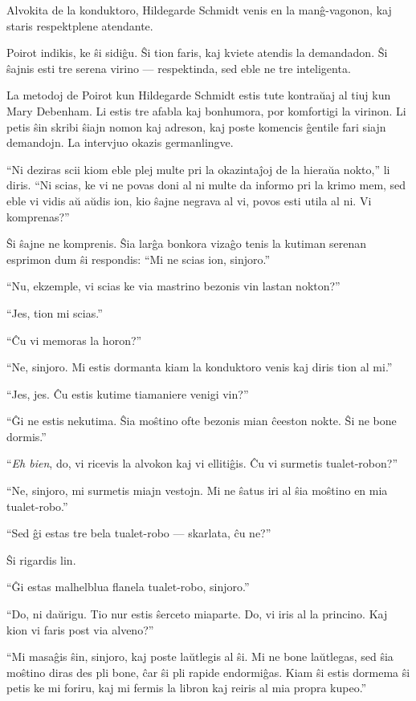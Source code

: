 Alvokita de la konduktoro, Hildegarde Schmidt venis en la manĝ-vagonon, kaj staris respektplene atendante.

Poirot indikis, ke ŝi sidiĝu. Ŝi tion faris, kaj kviete atendis la demandadon. Ŝi ŝajnis esti tre serena virino --- respektinda, sed eble ne tre inteligenta.

La metodoj de Poirot kun Hildegarde Schmidt estis tute kontraŭaj al tiuj kun Mary Debenham. Li estis tre afabla kaj bonhumora, por komfortigi la virinon. Li petis ŝin skribi ŝiajn nomon kaj adreson, kaj poste komencis ĝentile fari siajn demandojn. La intervjuo okazis germanlingve.

``Ni deziras scii kiom eble plej multe pri la okazintaĵoj de la hieraŭa nokto,'' li diris. ``Ni scias, ke vi ne povas doni al ni multe da informo pri la krimo mem, sed eble vi vidis aŭ aŭdis ion, kio ŝajne negrava al vi, povos esti utila al ni. Vi komprenas?''

Ŝi ŝajne ne komprenis. Ŝia larĝa bonkora vizaĝo tenis la kutiman serenan esprimon dum ŝi respondis: ``Mi ne scias ion, sinjoro.''

``Nu, ekzemple, vi scias ke via mastrino bezonis vin lastan nokton?''

``Jes, tion mi scias.''

``Ĉu vi memoras la horon?''

``Ne, sinjoro. Mi estis dormanta kiam la konduktoro venis kaj diris tion al mi.''

``Jes, jes. Ĉu estis kutime tiamaniere venigi vin?''

``Ĝi ne estis nekutima. Ŝia moŝtino ofte bezonis mian ĉeeston nokte. Ŝi ne bone dormis.''

``\emph{Eh bien}, do, vi ricevis la alvokon kaj vi ellitiĝis. Ĉu vi surmetis tualet-robon?''

``Ne, sinjoro, mi surmetis miajn vestojn. Mi ne ŝatus iri al ŝia moŝtino en mia tualet-robo.''

``Sed ĝi estas tre bela tualet-robo --- skarlata, ĉu ne?''

Ŝi rigardis lin.

``Ĝi estas malhelblua flanela tualet-robo, sinjoro.''

``Do, ni daŭrigu. Tio nur estis ŝerceto miaparte. Do, vi iris al la princino. Kaj kion vi faris post via alveno?''

``Mi masaĝis ŝin, sinjoro, kaj poste laŭtlegis al ŝi. Mi ne bone laŭtlegas, sed ŝia moŝtino diras des pli bone, ĉar ŝi pli rapide endormiĝas. Kiam ŝi estis dormema ŝi petis ke mi foriru, kaj mi fermis la libron kaj reiris al mia propra kupeo.''

